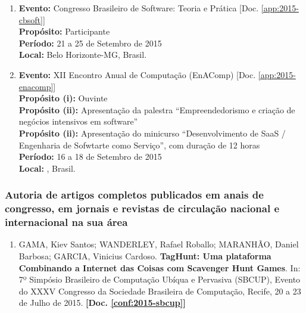 \documentclass[a4paper,oneside,12pt]{article}
\begin{document}
\begin{enumerate}
\renewcommand{\labelenumi}{{\large\bfseries\arabic{enumi}.}}

\item   \textbf{Evento:} Congresso Brasileiro de Software: Teoria e Prática [Doc. \ref{app:2015-cbsoft}] \\
        \textbf{Propósito:} Participante\\
        \textbf{Período:} 21 a 25 de Setembro de 2015\\
        \textbf{Local:} Belo Horizonte-MG, Brasil.

\item   \textbf{Evento:} XII Encontro Anual de Computação (EnAComp) [Doc. \ref{app:2015-enacomp}] \\
        \textbf{Propósito (i):} Ouvinte\\
        \textbf{Propósito (ii):} Apresentação da palestra ``Empreendedorismo e criação de negócios intensivos em software''\\
        \textbf{Propósito (ii):} Apresentação do minicurso ``Desenvolvimento de SaaS / Engenharia de Sofwtarte como Serviço'', com duração de 12 horas\\
        \textbf{Período:} 16 a 18 de Setembro de 2015\\
        \textbf{Local:} , Brasil.

\end{enumerate}

\subsubsection{Autoria de artigos completos publicados em anais de congresso, em jornais e revistas de circulação nacional e internacional na sua área}
\vspace{0.3cm}

\begin{enumerate}
\renewcommand{\labelenumi}{{\large\bfseries\arabic{enumi}.}}

\item GAMA, Kiev Santos; WANDERLEY, Rafael Roballo; MARANHÃO, Daniel Barbosa; GARCIA, Vinicius Cardoso. \textbf{TagHunt: Uma plataforma Combinando a Internet das Coisas com Scavenger Hunt Games}. In: 7º Simpósio Brasileiro de Computação Ubíqua e Pervasiva (SBCUP), Evento do XXXV Congresso da Sociedade Brasileira de Computação, Recife, 20 a 23 de Julho de 2015. \textbf{[Doc. \ref{conf:2015-sbcup}]}

\end{enumerate}
\end{document}
